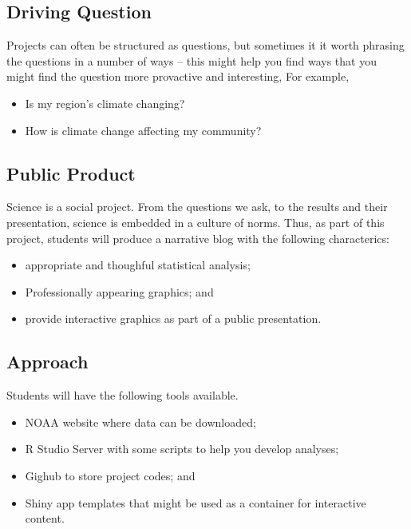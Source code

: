 \documentclass{article}\usepackage[]{graphicx}\usepackage[]{color}
\begin{document}
\subsection{Driving Question}

Projects can often be structured as questions, but sometimes it it worth phrasing the questions in a number of ways -- this might help you find ways that you might find the question more provactive and interesting, For example,

\begin{itemize}
  \item Is my region's climate changing?
  \item How is climate change affecting my community?
\end{itemize}




\subsection{Public Product}

Science is a social project. From the questions we ask, to the results and their presentation, science is embedded in a culture of norms. Thus, as part of this project, students will produce a narrative blog with the following characterics:

\begin{itemize}
  \item appropriate and thoughful statistical analysis;
  \item Professionally appearing graphics; and 
  \item provide interactive graphics as part of a public presentation.
\end{itemize}

\subsection{Approach}

Students will have the following tools available.

\begin{itemize}
  \item NOAA website where data can be downloaded;
  \item R Studio Server with some scripts to help you develop analyses;
  \item Gighub to store project codes; and
  \item Shiny app templates that might be used as a container for interactive content.
\end{itemize}
\end{document}
